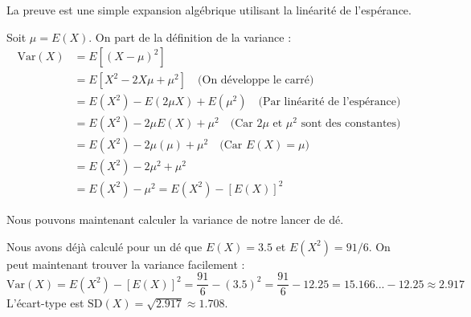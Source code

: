 La preuve est une simple expansion algébrique utilisant la linéarité de l'espérance.

\begin{proofbox}
Soit $\mu = E(X)$. On part de la définition de la variance :
\begin{align*}
\text{Var}(X) &= E[ (X - \mu)^2 ] \\
&= E[ X^2 - 2X\mu + \mu^2 ] \quad \text{(On développe le carré)} \\
&= E(X^2) - E(2\mu X) + E(\mu^2) \quad \text{(Par linéarité de l'espérance)} \\
&= E(X^2) - 2\mu E(X) + \mu^2 \quad \text{(Car $2\mu$ et $\mu^2$ sont des constantes)} \\
&= E(X^2) - 2\mu(\mu) + \mu^2 \quad \text{(Car $E(X) = \mu$)} \\
&= E(X^2) - 2\mu^2 + \mu^2 \\
&= E(X^2) - \mu^2 = E(X^2) - [E(X)]^2
\end{align*}
\end{proofbox}

Nous pouvons maintenant calculer la variance de notre lancer de dé.

\begin{examplebox}
Nous avons déjà calculé pour un dé que $E(X) = 3.5$ et $E(X^2) = 91/6$. On peut maintenant trouver la variance facilement :
$$ \text{Var}(X) = E(X^2) - [E(X)]^2 = \frac{91}{6} - (3.5)^2 = \frac{91}{6} - 12.25 = 15.166... - 12.25 \approx 2.917 $$
L'écart-type est $\text{SD}(X) = \sqrt{2.917} \approx 1.708$.
\end{examplebox}
